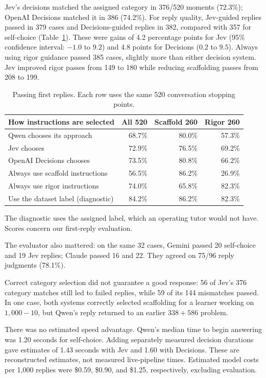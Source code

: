 Jev's decisions matched the assigned category in 376/520 moments (72.3\%); OpenAI Decisions matched it in 386 (74.2\%). For reply quality, Jev-guided replies passed in 379 cases and Decisions-guided replies in 382, compared with 357 for self-choice (Table~\ref{tab:routing}). These were gains of 4.2 percentage points for Jev (95\% confidence interval: $-1.0$ to $9.2$) and 4.8 points for Decisions ($0.2$ to $9.5$). Always using rigor guidance passed 385 cases, slightly more than either decision system. Jev improved rigor passes from 149 to 180 while reducing scaffolding passes from 208 to 199.

\begin{table}[ht]
\centering\small
\caption{Passing first replies. Each row uses the same 520 conversation stopping points.}
\label{tab:routing}
\begin{tabularx}{\linewidth}{@{}Xrrr@{}}
\toprule
How instructions are selected & All 520 & Scaffold 260 & Rigor 260\\
\midrule
Qwen chooses its approach &68.7\%&80.0\%&57.3\%\\
Jev chooses &72.9\%&76.5\%&69.2\%\\
OpenAI Decisions chooses &73.5\%&80.8\%&66.2\%\\
Always use scaffold instructions &56.5\%&86.2\%&26.9\%\\
Always use rigor instructions &74.0\%&65.8\%&82.3\%\\
Use the dataset label (diagnostic) &84.2\%&86.2\%&82.3\%\\
\bottomrule
\end{tabularx}
\vspace{2pt}
\begin{minipage}{\linewidth}\footnotesize
The diagnostic uses the assigned label, which an operating tutor would not have. Scores concern our first-reply evaluation.
\end{minipage}
\end{table}

The evaluator also mattered: on the same 32 cases, Gemini passed 20 self-choice and 19 Jev replies; Claude passed 16 and 22. They agreed on 75/96 reply judgments (78.1\%).

Correct category selection did not guarantee a good response: 56 of Jev's 376 category matches still led to failed replies, while 59 of its 144 mismatches passed. In one case, both systems correctly selected scaffolding for a learner working on $1{,}000-10$, but Qwen's reply returned to an earlier $338+586$ problem.

There was no estimated speed advantage. Qwen's median time to begin answering was 1.20 seconds for self-choice. Adding separately measured decision durations gave estimates of 1.43 seconds with Jev and 1.60 with Decisions. These are reconstructed estimates, not measured live-pipeline times. Estimated model costs per 1,000 replies were \$0.59, \$0.90, and \$1.25, respectively, excluding evaluation.
